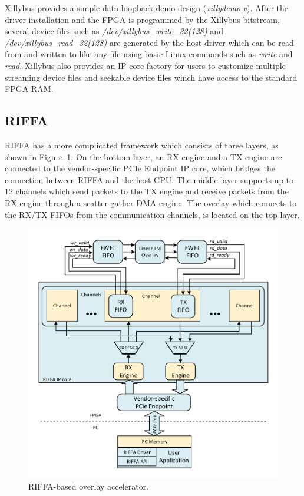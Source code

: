 Xillybus provides a simple data loopback demo design (\textit{xillydemo.v}).   
After the driver installation and the FPGA is programmed by the Xillybus bitstream, several device files such as \textit{/dev/xillybus\_write\_32(128)} and \textit{/dev/xillybus\_read\_32(128)} are generated by the host driver which can be read from and written to like any file using basic Linux commands such as \textit{write} and \textit{read}. 
Xillybus also provides an IP core factory for users to customize multiple streaming device files and seekable device files which have access to the standard FPGA RAM. 

\subsection{RIFFA}
RIFFA has a more complicated framework which consists of three layers, as shown in Figure~\ref{riffa}. 
On the bottom layer, an RX engine and a TX engine are connected to the vendor-specific PCIe Endpoint IP core, which bridges the connection between RIFFA and the host CPU. 
The middle layer supports up to 12 channels which send packets to the TX engine and receive packets from the RX engine through a scatter-gather DMA engine. 
The overlay which connects to the RX/TX FIFOs from the communication channels, is located on the top layer. 

\begin{figure}[tb]
	\centering
	\includegraphics[width=0.9\columnwidth]{Figures/riffa.pdf}
	\caption{RIFFA-based overlay accelerator.}
	\label{riffa}
\end{figure}

